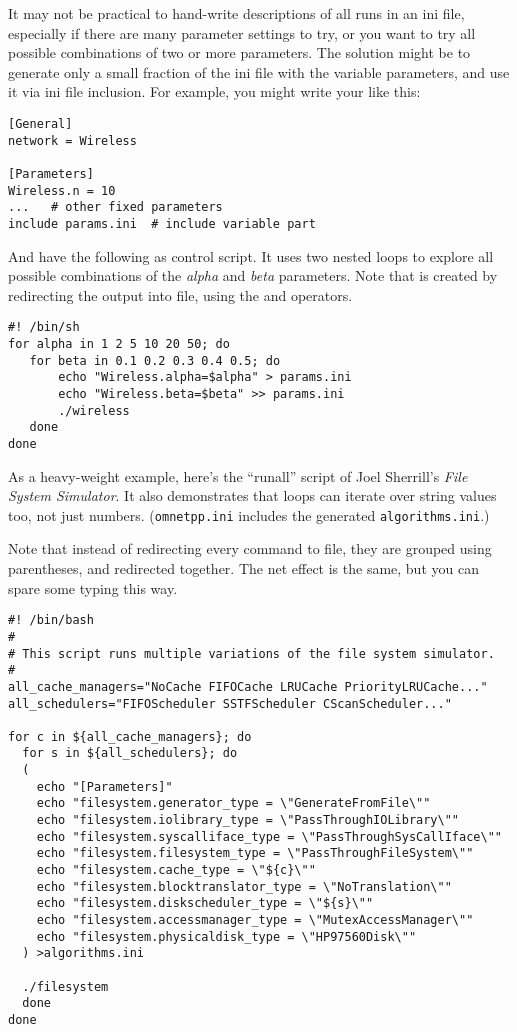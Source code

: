 It may not be practical to hand-write descriptions of all runs
in an ini file, especially if there are many parameter
settings to try, or you want to try all possible
combinations of two or more parameters.
The solution might be to generate only a small fraction
of the ini file with the variable parameters, and
use it via ini file inclusion. For example, you might
write your  like this:

\begin{verbatim}
[General]
network = Wireless

[Parameters]
Wireless.n = 10
...   # other fixed parameters
include params.ini  # include variable part
\end{verbatim}

And have the following as control script. It uses two nested loops to explore
all possible combinations of the \textit{alpha} and \textit{beta} parameters.
Note that  is created by redirecting the 
output into file, using the \ttt{>} and \ttt{>>} operators.

\begin{verbatim}
#! /bin/sh
for alpha in 1 2 5 10 20 50; do
   for beta in 0.1 0.2 0.3 0.4 0.5; do
       echo "Wireless.alpha=$alpha" > params.ini
       echo "Wireless.beta=$beta" >> params.ini
       ./wireless
   done
done
\end{verbatim}


As a heavy-weight example, here's the ``runall'' script of
Joel Sherrill's \textit{File System Simulator}. It also demonstrates
that loops can iterate over string values too, not just numbers.
(\texttt{omnetpp.ini} includes the generated \texttt{algorithms.ini}.)

Note that instead of redirecting every  command to file,
they are grouped using parentheses, and redirected together.
The net effect is the same, but you can spare some typing this way.

\begin{verbatim}
#! /bin/bash
#
# This script runs multiple variations of the file system simulator.
#
all_cache_managers="NoCache FIFOCache LRUCache PriorityLRUCache..."
all_schedulers="FIFOScheduler SSTFScheduler CScanScheduler..."

for c in ${all_cache_managers}; do
  for s in ${all_schedulers}; do
  (
    echo "[Parameters]"
    echo "filesystem.generator_type = \"GenerateFromFile\""
    echo "filesystem.iolibrary_type = \"PassThroughIOLibrary\""
    echo "filesystem.syscalliface_type = \"PassThroughSysCallIface\""
    echo "filesystem.filesystem_type = \"PassThroughFileSystem\""
    echo "filesystem.cache_type = \"${c}\""
    echo "filesystem.blocktranslator_type = \"NoTranslation\""
    echo "filesystem.diskscheduler_type = \"${s}\""
    echo "filesystem.accessmanager_type = \"MutexAccessManager\""
    echo "filesystem.physicaldisk_type = \"HP97560Disk\""
  ) >algorithms.ini

  ./filesystem
  done
done
\end{verbatim}



